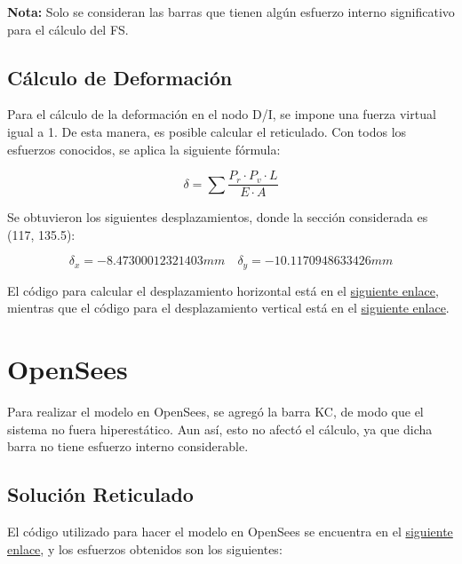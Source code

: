 \textbf{Nota:} Solo se consideran las barras que tienen algún esfuerzo interno significativo para el cálculo del FS.

\subsection{Cálculo de Deformación}

Para el cálculo de la deformación en el nodo D/I, se impone una fuerza virtual igual a 1. De esta manera, es posible calcular el reticulado. Con todos los esfuerzos conocidos, se aplica la siguiente fórmula:

\begin{equation}
    \delta = \sum   \frac{P_r \cdot P_v \cdot L}{E\cdot A}
\end{equation}

Se obtuvieron los siguientes desplazamientos, donde la sección considerada es (117, 135.5):

\begin{equation}
    \delta_x = -8.47300012321403 mm \quad \delta_y = -10.1170948633426 mm
\end{equation}

El código para calcular el desplazamiento horizontal está en el \href{https://github.com/LukasWolff2002/PROYECTO_3_MCOC/blob/main/CODIGO/CODIGO_MANUAL/desplazamiento_horizontal.py}{siguiente enlace}, mientras que el código para el desplazamiento vertical está en el \href{https://github.com/LukasWolff2002/PROYECTO_3_MCOC/blob/main/CODIGO/CODIGO_MANUAL/desplazamiento_vertical.py}{siguiente enlace}.

\section{OpenSees}

Para realizar el modelo en OpenSees, se agregó la barra KC, de modo que el sistema no fuera hiperestático. Aun así, esto no afectó el cálculo, ya que dicha barra no tiene esfuerzo interno considerable.

\subsection{Solución Reticulado}

El código utilizado para hacer el modelo en OpenSees se encuentra en el \href{https://github.com/LukasWolff2002/PROYECTO_3_MCOC/blob/main/CODIGO/OPENSEES/E0_Wolff.py}{siguiente enlace}, y los esfuerzos obtenidos son los siguientes:

